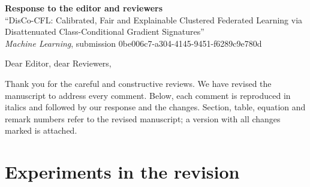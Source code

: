 \documentclass[11pt]{article}
\begin{document}
\begin{center}
{\large\bfseries Response to the editor and reviewers}\\[4pt]
``DisCo-CFL: Calibrated, Fair and Explainable Clustered Federated Learning via Disattenuated Class-Conditional Gradient Signatures''\\
\emph{Machine Learning}, submission 0be006c7-a304-4145-9451-f6289c9e780d
\end{center}

Dear Editor, dear Reviewers,

Thank you for the careful and constructive reviews. We have revised the manuscript to address every comment. Below, each comment is reproduced in italics and followed by our response and the changes. Section, table, equation and remark numbers refer to the revised manuscript; a version with all changes marked is attached.

\section*{Experiments in the revision}
\end{document}
